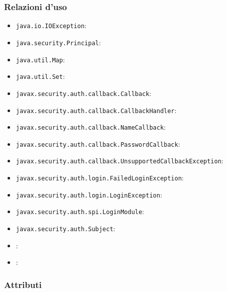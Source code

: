 \subsubsection*{Relazioni d'uso}
\begin{itemize}
	\item \texttt{java.io.IOException}:
	\item \texttt{java.security.Principal}:
	\item \texttt{java.util.Map}:
	\item \texttt{java.util.Set}:
	\item \texttt{javax.security.auth.callback.Callback}:
	\item \texttt{javax.security.auth.callback.CallbackHandler}:
	\item \texttt{javax.security.auth.callback.NameCallback}:
	\item \texttt{javax.security.auth.callback.PasswordCallback}:
	\item \texttt{javax.security.auth.callback.UnsupportedCallbackException}:
	\item \texttt{javax.security.auth.login.FailedLoginException}:
	\item \texttt{javax.security.auth.login.LoginException}:
	\item \texttt{javax.security.auth.spi.LoginModule}:
	\item \texttt{javax.security.auth.Subject}:
	\item {}:
	\item {}:
\end{itemize}

\subsubsection*{Attributi}
\begin{description}
  \item{}\\
  \item{}\\
  \item{}\\
  \item{}\\
  \item{}\\
  \item{}\\
  \item{}\\
\end{description}


